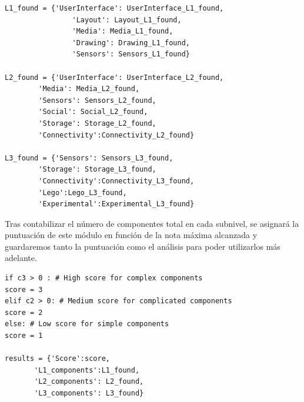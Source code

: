 \documentclass[a4paper, 12pt]{book}
\begin{document}
\begin{lstlisting}
L1_found = {'UserInterface': UserInterface_L1_found,
                'Layout': Layout_L1_found,
                'Media': Media_L1_found,
                'Drawing': Drawing_L1_found,
                'Sensors': Sensors_L1_found}
    
L2_found = {'UserInterface': UserInterface_L2_found,
        'Media': Media_L2_found,
        'Sensors': Sensors_L2_found,
        'Social': Social_L2_found,
        'Storage': Storage_L2_found,
        'Connectivity':Connectivity_L2_found}
    
L3_found = {'Sensors': Sensors_L3_found,
        'Storage': Storage_L3_found,
        'Connectivity':Connectivity_L3_found,
        'Lego':Lego_L3_found,
        'Experimental':Experimental_L3_found}
\end{lstlisting}
Tras contabilizar el número de componentes total en cada subnivel, se asignará la puntuación de este módulo en función de la nota máxima alcanzada y guardaremos tanto la puntuación como el análisis para poder utilizarlos más adelante.   
\begin{lstlisting}
if c3 > 0 : # High score for complex components
score = 3
elif c2 > 0: # Medium score for complicated components
score = 2
else: # Low score for simple components
score = 1

results = {'Score':score,
       'L1_components':L1_found,
       'L2_components': L2_found,
       'L3_components': L3_found}
\end{lstlisting}
\end{document}
